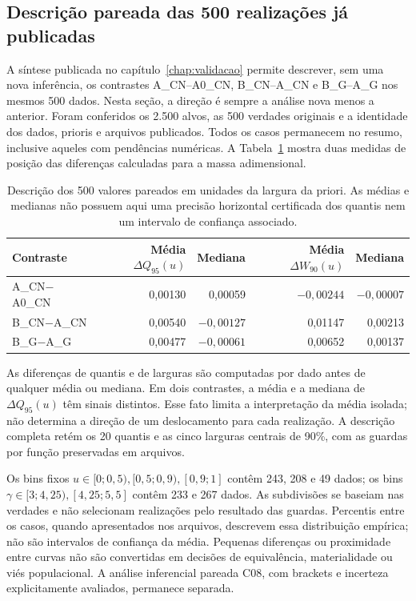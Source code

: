 \subsection{Descrição pareada das 500 realizações já publicadas}
\label{sec:comp-c07-descritivo}

A síntese publicada no capítulo~\ref{chap:validacao} permite descrever,
sem uma nova inferência, os contrastes A\_CN--A0\_CN, B\_CN--A\_CN e
B\_G--A\_G nos mesmos 500 dados. Nesta seção, a direção é sempre a
análise nova menos a anterior. Foram conferidos os 2.500 alvos, as 500
verdades originais e a identidade dos dados, prioris e arquivos publicados.
Todos os casos permanecem no resumo, inclusive aqueles com pendências
numéricas. A Tabela~\ref{tab:comp-descritivo500} mostra duas medidas de
posição das diferenças calculadas para a massa adimensional.

\begin{table}[htbp]
\centering\small
\caption{Descrição dos 500 valores pareados em unidades da largura da priori.
As médias e medianas não possuem aqui uma precisão horizontal certificada
dos quantis nem um intervalo de confiança associado.}
\label{tab:comp-descritivo500}
\begin{tabular}{lrrrr}
\toprule
Contraste & Média $\Delta Q_{95}(u)$ & Mediana & Média $\Delta W_{90}(u)$ & Mediana\\
\midrule
A\_CN$-$A0\_CN & 0,00130 & 0,00059 & $-0,00244$ & $-0,00007$\\
B\_CN$-$A\_CN & 0,00540 & $-0,00127$ & 0,01147 & 0,00213\\
B\_G$-$A\_G & 0,00477 & $-0,00061$ & 0,00652 & 0,00137\\
\bottomrule
\end{tabular}
\end{table}

As diferenças de quantis e de larguras são computadas por dado antes de
qualquer média ou mediana. Em dois contrastes, a média e a mediana de
$\Delta Q_{95}(u)$ têm sinais distintos. Esse fato limita a interpretação
da média isolada; não determina a direção de um deslocamento para cada
realização. A descrição completa retém os 20 quantis e as cinco larguras
centrais de 90\%, com as guardas por função preservadas em arquivos.

Os bins fixos $u\in[0;0{,}5),[0{,}5;0{,}9),[0{,}9;1]$ contêm
243, 208 e 49 dados; os bins $\gamma\in[3;4{,}25),[4{,}25;5{,}5]$
contêm 233 e 267 dados. As subdivisões se baseiam nas verdades e não
selecionam realizações pelo resultado das guardas. Percentis entre os casos,
quando apresentados nos arquivos, descrevem essa distribuição empírica;
não são intervalos de confiança da média. Pequenas diferenças ou
proximidade entre curvas não são convertidas em decisões de equivalência,
materialidade ou viés populacional. A análise inferencial pareada C08, com
brackets e incerteza explicitamente avaliados, permanece separada.

